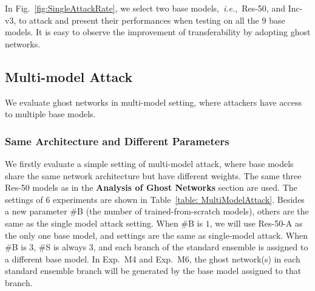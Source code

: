 \documentclass[letterpaper]{article} %
\def\ie{\emph{i.e.}}
\begin{document}
In Fig.~\ref{fig:SingleAttackRate}, we select two base models,~\ie,~Res-50, and Inc-v3, to attack and present their performances when testing on all the $9$ base models. It is easy to observe the improvement of transferability by adopting ghost networks.



\subsection{Multi-model Attack} \label{sec:multiModelAttackExp}
We evaluate ghost networks in multi-model setting, where attackers have access to multiple base models.


\subsubsection{Same Architecture and Different Parameters}
We firstly evaluate a simple setting of multi-model attack, where base models share the same network architecture but have different weights. The same three Res-50 models as in the \textbf{Analysis of Ghost Networks} section are used. The settings of $6$ experiments are shown in Table~\ref{table: MultiModelAttack}. Besides a new parameter \#B (the number of trained-from-scratch models), others are the same as the single model attack setting. When \#B is $1$, we will use Res-50-A as the only one base model, and settings are the same as single-model attack. When \#B is $3$, \#S is always $3$, and each branch of the standard ensemble is assigned to a different base model. In Exp.~M4 and Exp.~M6, the ghost network(s) in each standard ensemble branch will be generated by the base model assigned to that branch.




\end{document}
